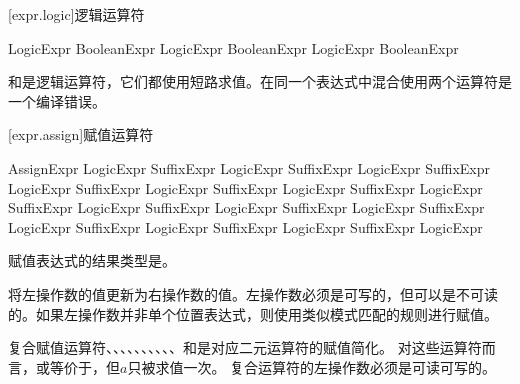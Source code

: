 [expr.logic]{逻辑运算符}

\begin{bnf}{LogicExpr}
    BooleanExpr \br
    LogicExpr \terminal{\&} BooleanExpr \br
    LogicExpr \terminal{|} BooleanExpr
\end{bnf}

\pnum
\tcode{\&}和\tcode{|}是逻辑运算符，它们都使用短路求值。在同一个表达式中混合使用两个运算符是一个编译错误。

[expr.assign]{赋值运算符}

\begin{bnf}{AssignExpr}
    LogicExpr \br
    SuffixExpr \terminal{=} LogicExpr \br
    SuffixExpr \terminal{+=} LogicExpr \br
    SuffixExpr \terminal{-=} LogicExpr \br
    SuffixExpr \terminal{*=} LogicExpr \br
    SuffixExpr \terminal{/=} LogicExpr \br
    SuffixExpr \terminal{\%=} LogicExpr \br
    SuffixExpr  LogicExpr \br
    SuffixExpr  LogicExpr \br
    SuffixExpr  LogicExpr \br
    SuffixExpr  LogicExpr \br
    SuffixExpr  LogicExpr \br
    SuffixExpr  LogicExpr \br
    SuffixExpr \terminal{\~=} LogicExpr
\end{bnf}

\pnum
赋值表达式的结果类型是。

\pnum
\tcode{=}将左操作数的值更新为右操作数的值。左操作数必须是可写的，但可以是不可读的。如果左操作数并非单个位置表达式，则使用类似模式匹配的规则进行赋值。

\pnum
复合赋值运算符\tcode{+=}、\tcode{-=}、\tcode{*=}、\tcode{/=}、\tcode{\%=}、、、、、、\tcode{\~=}和是对应二元运算符的赋值简化。
对这些运算符而言，或等价于，但$a$只被求值一次。
复合运算符的左操作数必须是可读可写的。